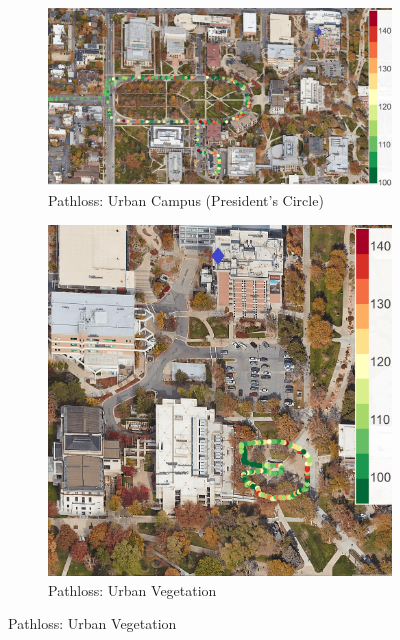 \documentclass[10pt, twocolumn]{IEEEtran}
\begin{document}
\begin{figure} [t]
     \centering
     \begin{subfigure}{0.48\linewidth}
         \centering
         \includegraphics[width=1.0\linewidth]{figs/pl_urban_campus.jpg}
         \caption{Pathloss: Urban Campus (President's Circle)}
         \label{F5a}
     \end{subfigure}
     \begin{subfigure}{0.245\linewidth}
         \centering
         \includegraphics[width=1.0\linewidth]{figs/pl_urban_vegetation.jpg}
         \caption{Pathloss: Urban Vegetation}
         \label{F5b}
     \end{subfigure}

\end{figure}
\end{document}
